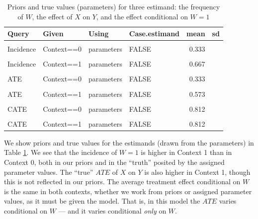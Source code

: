 \documentclass[
  12pt,
]{book}
\begin{document}
\begin{table}

\caption{\label{tab:appev2}Priors and true values (parameters) for three estimand: the frequency of $W$, the effect of $X$ on $Y$, and the effect conditional on $W=1$}
\centering
\begin{tabular}[t]{llllrr}
\toprule
Query & Given & Using & Case.estimand & mean & sd\\
\midrule
\cellcolor{gray!6}{Incidence} & \cellcolor{gray!6}{Context==0} & \cellcolor{gray!6}{priors} & \cellcolor{gray!6}{FALSE} & \cellcolor{gray!6}{0.332} & \cellcolor{gray!6}{0.231}\\
Incidence & Context==0 & parameters & FALSE & 0.333 & \\
\cellcolor{gray!6}{Incidence} & \cellcolor{gray!6}{Context==1} & \cellcolor{gray!6}{priors} & \cellcolor{gray!6}{FALSE} & \cellcolor{gray!6}{0.666} & \cellcolor{gray!6}{0.234}\\
Incidence & Context==1 & parameters & FALSE & 0.667 & \\
\cellcolor{gray!6}{ATE} & \cellcolor{gray!6}{Context==0} & \cellcolor{gray!6}{priors} & \cellcolor{gray!6}{FALSE} & \cellcolor{gray!6}{0.001} & \cellcolor{gray!6}{0.138}\\
\addlinespace
ATE & Context==0 & parameters & FALSE & 0.333 & \\
\cellcolor{gray!6}{ATE} & \cellcolor{gray!6}{Context==1} & \cellcolor{gray!6}{priors} & \cellcolor{gray!6}{FALSE} & \cellcolor{gray!6}{0.000} & \cellcolor{gray!6}{0.140}\\
ATE & Context==1 & parameters & FALSE & 0.573 & \\
\cellcolor{gray!6}{CATE} & \cellcolor{gray!6}{Context==0} & \cellcolor{gray!6}{priors} & \cellcolor{gray!6}{FALSE} & \cellcolor{gray!6}{0.001} & \cellcolor{gray!6}{0.169}\\
CATE & Context==0 & parameters & FALSE & 0.812 & \\
\addlinespace
\cellcolor{gray!6}{CATE} & \cellcolor{gray!6}{Context==1} & \cellcolor{gray!6}{priors} & \cellcolor{gray!6}{FALSE} & \cellcolor{gray!6}{0.001} & \cellcolor{gray!6}{0.169}\\
CATE & Context==1 & parameters & FALSE & 0.812 & \\
\bottomrule
\end{tabular}
\end{table}

We show priors and true values for the estimands (drawn from the parameters) in Table \ref{tab:appev2}. We see that the incidence of \(W=1\) is higher in Context 1 than in Context 0, both in our priors and in the ``truth'' posited by the assigned parameter values. The ``true'' \(ATE\) of \(X\) on \(Y\) is also higher in Context 1, though this is not reflected in our priors. The average treatment effect conditional on \(W\) is the same in both contexts, whether we work from priors or assigned parameter values, as it must be given the model. That is, in this model the \(ATE\) varies conditional on \(W\) --- and it varies conditional \emph{only} on \(W\).
\end{document}
